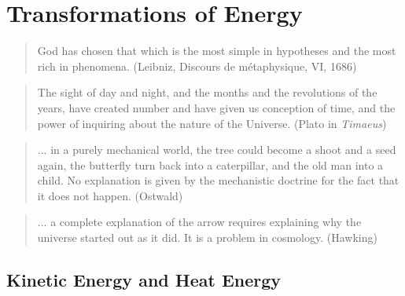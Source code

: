 \chapter{Transformations of Energy}



\small

\begin{quote}
God has chosen that which is the most simple in 
hypotheses and the most rich in phenomena. (Leibniz, 
Discours de m\'etaphysique, VI, 1686)
\end{quote} 


\begin{quote}
The sight of day and night, and the months and the revolutions of the
years, have created number and have given us conception of time,
and the power of inquiring about the nature of the Universe. (Plato 
in \emph{Timaeus})
\end{quote}

\begin{quote}
... in a purely mechanical world, the tree could become a shoot 
and a seed again, the butterfly turn back into a caterpillar, and the
old man into a child. No explanation is given by the mechanistic doctrine
for the fact that it does not happen. (Ostwald)
\end{quote}

\begin{quote} ... a complete explanation of the arrow requires
explaining why the universe started out as it did. It is a problem
in cosmology. (Hawking)
\end{quote}
\normalsize

\section{Kinetic Energy and Heat Energy}

